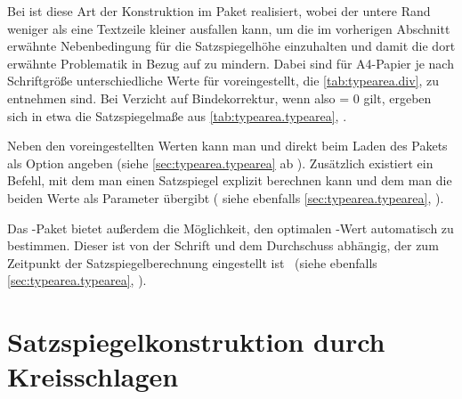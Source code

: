 \begin{Explain}
  Bei {\KOMAScript} ist diese Art der Konstruktion im Paket 
  realisiert, wobei der untere Rand weniger als eine Textzeile kleiner
  ausfallen kann, um die im vorherigen Abschnitt erwähnte Nebenbedingung für
  die Satzspiegelhöhe einzuhalten und damit die dort erwähnte Problematik in
  Bezug auf  zu mindern. Dabei sind für
  A4-Papier je nach Schriftgröße unterschiedliche Werte für 
  voreingestellt, die \autoref{tab:typearea.div},
   zu entnehmen sind. Bei Verzicht auf
  Bindekorrektur, wenn also  = 0 gilt, ergeben sich in etwa
  die Satzspiegelmaße aus \autoref{tab:typearea.typearea},
  .

  Neben den voreingestellten Werten kann man  und  direkt
  beim Laden des Pakets als Option angeben (siehe
  \autoref{sec:typearea.typearea} ab
  ). Zusätzlich existiert ein Befehl, mit
  dem man einen Satzspiegel explizit berechnen kann und dem man die beiden
  Werte als Parameter übergibt (\iftrue%
  siehe ebenfalls
  \autoref{sec:typearea.typearea}, \fi{}).

  Das -Paket bietet außerdem die Möglichkeit, den optimalen
  -Wert automatisch zu bestimmen. Dieser ist von der Schrift und dem
  Durchschuss abhängig, der zum Zeitpunkt der Satzspiegelberechnung
  eingestellt ist%
  \iffalse%
  . Siehe hierzu ebenfalls \autoref{sec:typearea.typearea}, %
  \else\ (siehe ebenfalls \autoref{sec:typearea.typearea}, %
  \fi%
  \iffalse\else)\fi.%
\end{Explain}%


\section{Satzspiegelkonstruktion durch Kreisschlagen}

